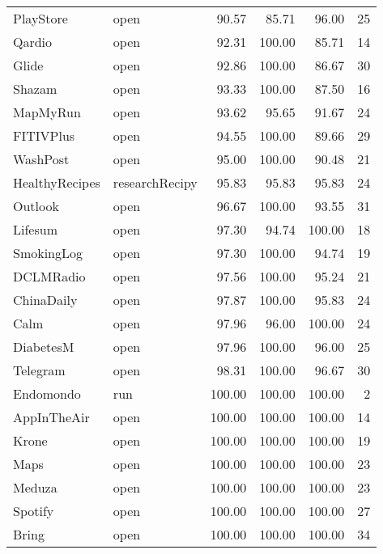 \begin{table}[ht]
\centering
 \begin{tabular}{llrrrr} 
 \toprule
PlayStore & open                &   90.57 &      85.71 &   96.00 &     25 \\
Qardio & open                   &   92.31 &     100.00 &   85.71 &     14 \\
Glide & open                    &   92.86 &     100.00 &   86.67 &     30 \\
Shazam & open                   &   93.33 &     100.00 &   87.50 &     16 \\
MapMyRun & open                 &   93.62 &      95.65 &   91.67 &     24 \\
FITIVPlus & open                &   94.55 &     100.00 &   89.66 &     29 \\
WashPost & open                 &   95.00 &     100.00 &   90.48 &     21 \\
HealthyRecipes & researchRecipy &   95.83 &      95.83 &   95.83 &     24 \\
Outlook & open                  &   96.67 &     100.00 &   93.55 &     31 \\
Lifesum & open                  &   97.30 &      94.74 &  100.00 &     18 \\
SmokingLog & open               &   97.30 &     100.00 &   94.74 &     19 \\
DCLMRadio & open                &   97.56 &     100.00 &   95.24 &     21 \\
ChinaDaily & open               &   97.87 &     100.00 &   95.83 &     24 \\
Calm & open                     &   97.96 &      96.00 &  100.00 &     24 \\
DiabetesM & open                &   97.96 &     100.00 &   96.00 &     25 \\
Telegram & open                 &   98.31 &     100.00 &   96.67 &     30 \\
Endomondo & run                 &  100.00 &     100.00 &  100.00 &      2 \\
AppInTheAir & open              &  100.00 &     100.00 &  100.00 &     14 \\
Krone & open                    &  100.00 &     100.00 &  100.00 &     19 \\
Maps & open                     &  100.00 &     100.00 &  100.00 &     23 \\
Meduza & open                   &  100.00 &     100.00 &  100.00 &     23 \\
Spotify & open                  &  100.00 &     100.00 &  100.00 &     27 \\
Bring & open                    &  100.00 &     100.00 &  100.00 &     34 \\
 \bottomrule
\end{tabular}
\end{table}